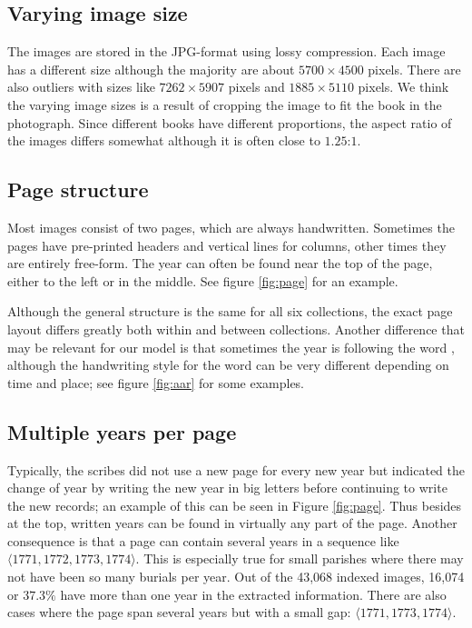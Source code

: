\subsection{Varying image size}

The images are stored in the JPG-format using lossy compression. Each image has a different size although the majority are about $5700 \times 4500$ pixels. There are also outliers with sizes like $7262 \times 5907$ pixels and $1885 \times 5110$ pixels. We think the varying image sizes is a result of cropping the image to fit the book in the photograph.
Since different books have different proportions, the aspect ratio of the images differs somewhat although it is often close to $1.25$:$1$.

\subsection{Page structure}

Most images consist of two pages, which are always handwritten. Sometimes the pages have pre-printed headers and vertical lines for columns, other times they are entirely free-form.
The year can often be found near the top of the page, either to the left or in the middle. See figure \ref{fig:page} for an example.



Although the general structure is the same for all six collections, the exact page layout differs greatly both within and between collections. Another difference that may be relevant for our model is that sometimes the year is following the word , although the handwriting style for the word can be very different depending on time and place; see figure \ref{fig:aar} for some examples.


\subsection{Multiple years per page} \label{sssec:swe_multiyear}

Typically, the scribes did not use a new page for every new year but indicated the change of year by writing the new year in big letters before continuing to write the new records; an example of this can be seen in Figure \ref{fig:page}.
Thus besides at the top, written years can be found in virtually any part of the page. Another consequence is that a page can contain several years in a sequence like $\langle 1771, 1772, 1773, 1774 \rangle$. This is especially true for small parishes where there may not have been so many burials per year. Out of the 43,068 indexed images, 16,074 or $37.3\%$ have more than one year in the extracted information. There are also cases where the page span several years but with a small gap: $\langle 1771, 1773, 1774 \rangle$.

